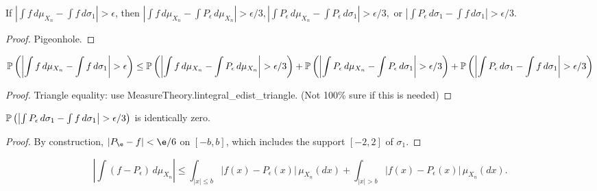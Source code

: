 \begin{lemma}
  \label{lem:f_pigeonhole}
  \notready
  If $\left|\int f\,d\mu_{X_n} - \int f\,d\sigma_1\right|>\epsilon$, then  $\left|\int f\,d\mu_{X_n} - \int P_\epsilon\,d\mu_{X_n}\right|>\epsilon/3, 
    \left|\int P_\epsilon\,d\mu_{X_n} - \int P_\epsilon\,d\sigma_1\right| >\epsilon/3,$ or $\left|\int P_\epsilon\,d\sigma_1 - \int f\,d\sigma_1\right|>\epsilon/3$.
\end{lemma}

\begin{proof}
  \notready
  Pigeonhole.
\end{proof}



\begin{lemma}
  \label{lem:f_probability_inequality}
  \notready
  \[
    \bP\left( \left|\int f\,d\mu_{X_n} - \int f\,d\sigma_1\right|>\epsilon\right) \le \bP\left(\left|\int f\,d\mu_{X_n} - \int P_\epsilon\,d\mu_{X_n}\right|>\epsilon/3\right)
    + \bP\left(\left|\int P_\epsilon\,d\mu_{X_n} - \int P_\epsilon\,d\sigma_1\right| >\epsilon/3\right) 
    + \bP\left(\left|\int P_\epsilon\,d\sigma_1 - \int f\,d\sigma_1\right|>\epsilon/3\right)
  \]
\end{lemma}

\begin{proof}
  \notready
  Triangle equality: use MeasureTheory.lintegral_edist_triangle. 
  (Not 100\% sure if this is needed)
\end{proof}


\begin{lemma}
  \label{lem:p_epsilon_minus_f_d_sigma_eq_zero}
  \notready
  $\bP\left(\left|\int P_\epsilon\,d\sigma_1 - \int f\,d\sigma_1\right|>\epsilon/3\right)$ is identically zero.
\end{lemma}

\begin{proof}
  \notready
  By construction, $|P_\e-f|<\e/6$ on $[-b,b]$, which includes the support $[-2,2]$ of $\sigma_1$.
\end{proof}

\begin{lemma}
  \label{lem:f_p_epsilon_inequality}
  \uses{}
  \notready
  \[ \left|\int (f-P_\epsilon)\,d\mu_{X_n}\right| \le \int_{|x|\le b} |f(x)-P_\epsilon(x)|\,\mu_{X_n}(dx) + \int_{|x|>b} |f(x)-P_\epsilon(x)|\,\mu_{X_n}(dx). \]
\end{lemma}


